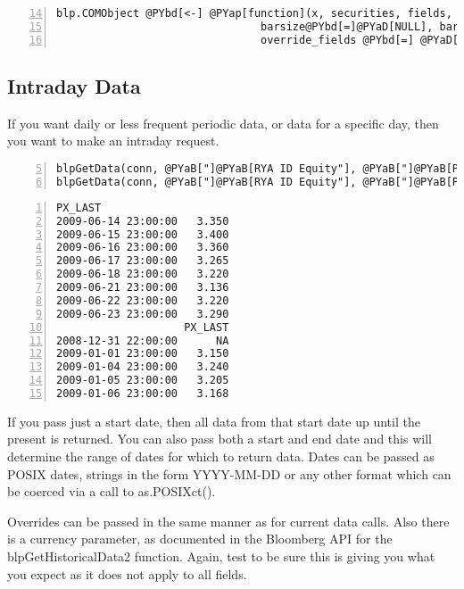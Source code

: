 \documentclass[a4paper]{article}
\begin{document}
\begin{Verbatim}[commandchars=@\[\],numbers=left,firstnumber=14,stepnumber=1]
blp.COMObject @PYbd[<-] @PYap[function](x, securities, fields, start@PYbd[=]@PYaD[NULL], end@PYbd[=]@PYaD[NULL],
                                barsize@PYbd[=]@PYaD[NULL], barfields@PYbd[=]@PYaD[NULL], retval@PYbd[=]@PYaD[NULL], 
                                override_fields @PYbd[=] @PYaD[NULL], overrides @PYbd[=] @PYaD[NULL], currency @PYbd[=] @PYaD[NULL], ...) {
\end{Verbatim}

    

\subsection{Intraday Data} %
\label{sub:intraday_data}

If you want daily or less frequent periodic data, or data for a specific day, then you want to make an intraday request.


\begin{Verbatim}[commandchars=@\[\],numbers=left,firstnumber=5,stepnumber=1]
blpGetData(conn, @PYaB["]@PYaB[RYA ID Equity"], @PYaB["]@PYaB[PX_LAST"], Sys.Date() @PYbd[-] @PYaR[10])
blpGetData(conn, @PYaB["]@PYaB[RYA ID Equity"], @PYaB["]@PYaB[PX_LAST"], @PYaB["]@PYaB[2009-01-01"], @PYaB["]@PYaB[2009-01-07"])
\end{Verbatim}

    

\begin{Verbatim}[commandchars=@\[\],numbers=left,firstnumber=1,stepnumber=1]
                    PX_LAST
2009-06-14 23:00:00   3.350
2009-06-15 23:00:00   3.400
2009-06-16 23:00:00   3.360
2009-06-17 23:00:00   3.265
2009-06-18 23:00:00   3.220
2009-06-21 23:00:00   3.136
2009-06-22 23:00:00   3.220
2009-06-23 23:00:00   3.290
                    PX_LAST
2008-12-31 22:00:00      NA
2009-01-01 23:00:00   3.150
2009-01-04 23:00:00   3.240
2009-01-05 23:00:00   3.205
2009-01-06 23:00:00   3.168
\end{Verbatim}

    

If you pass just a start date, then all data from that start date up until the present is returned. You can also pass both a start and end date and this will determine the range of dates for which to return data. Dates can be passed as POSIX dates, strings in the form YYYY-MM-DD or any other format which can be coerced via a call to as.POSIXct().

Overrides can be passed in the same manner as for current data calls. Also there is a currency parameter, as documented in the Bloomberg API for the blpGetHistoricalData2 function. Again, test to be sure this is giving you what you expect as it does not apply to all fields.




\end{document}

